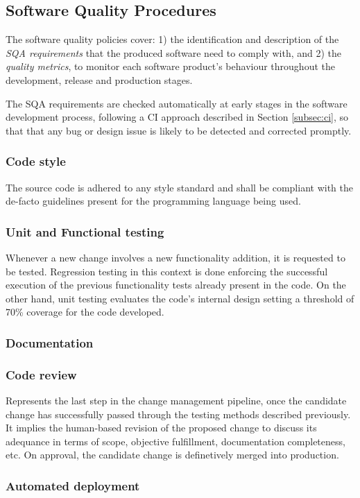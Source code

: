 \documentclass[journal]{IEEEtran}
\begin{document}
\subsection{Software Quality Procedures}
\label{subsec:sqa}

The software quality policies \cite{indigo-d31} cover: 1) the identification
and description of the \emph{SQA requirements} that the produced software need 
to comply with, and 2) the \emph{quality metrics}, to monitor each software product's 
behaviour throughout the development, release and production stages.

The SQA requirements are checked automatically at early stages in the software
development process, following a CI approach described in Section \ref{subsec:ci}, so
that that any bug or design issue is likely to be detected and corrected promptly.

\subsubsection{Code style}
The source code is adhered to any style standard and shall be compliant with the de-facto
guidelines present for the programming language being used.
\subsubsection{Unit and Functional testing}
Whenever a new change involves a new functionality addition, it is requested to be tested. 
Regression testing in this context is done enforcing the successful execution of the previous
functionality tests already present in the code. On the other hand, unit testing evaluates the
code's internal design setting a threshold of 70\% coverage for the code developed.
\subsubsection{Documentation}
\subsubsection{Code review}
Represents the last step in the change management pipeline, once the candidate change has 
successfully passed through the testing methods described previously. It implies the human-based
revision of the proposed change to discuss its adequance in terms of scope, objective fulfillment, 
documentation completeness, etc. On approval, the candidate change is definetively merged into
production.
\subsubsection{Automated deployment}
\end{document}
